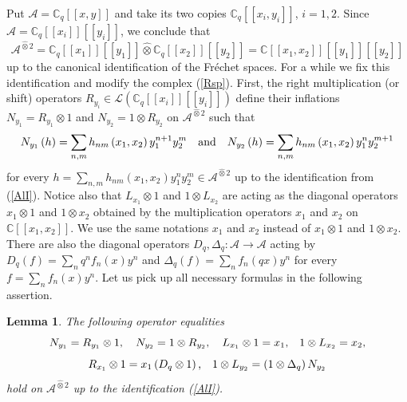 \documentclass[12pt,reqno]{amsart}%
\theoremstyle{plain}
\newtheorem{lemma}{Lemma}
\numberwithin{theorem}{section} \numberwithin{equation}{section}
\numberwithin{lemma}{section}
\numberwithin{remark}{section}
\numberwithin{example}{section}
\numberwithin{proposition}{section}
\numberwithin{definition}{section}
\numberwithin{corollary}{section}
\begin{document}
Put $\mathcal{A}=\mathbb{C}_{q}\left[  \left[  x,y\right]  \right]  $ and take
its two copies $\mathbb{C}_{q}\left[  \left[  x_{i},y_{i}\right]  \right]  $,
$i=1,2$. Since $\mathcal{A}=\mathbb{C}_{q}\left[  \left[  x_{i}\right]
\right]  \left[  \left[  y_{i}\right]  \right]  $, we conclude that
\begin{equation}
\mathcal{A}^{\widehat{\otimes}2}=\mathbb{C}_{q}\left[  \left[  x_{1}\right]
\right]  \left[  \left[  y_{1}\right]  \right]  \widehat{\otimes}%
\mathbb{C}_{q}\left[  \left[  x_{2}\right]  \right]  \left[  \left[
y_{2}\right]  \right]  =\mathbb{C}\left[  \left[  x_{1},x_{2}\right]  \right]
\left[  \left[  y_{1}\right]  \right]  \left[  \left[  y_{2}\right]  \right]
\label{AlI}%
\end{equation}
up to the canonical identification of the Fr\'{e}chet spaces. For a while we
fix this identification and modify the complex (\ref{Rsp}). First, the right
multiplication (or shift) operators $R_{y_{i}}\in\mathcal{L}\left(
\mathbb{C}_{q}\left[  \left[  x_{i}\right]  \right]  \left[  \left[
y_{i}\right]  \right]  \right)  $ define their inflations $N_{y_{1}}=R_{y_{1}%
}\otimes1$ and $N_{y_{2}}=1\otimes R_{y_{2}}$ on $\mathcal{A}%
^{\widehat{\otimes}2}$ such that
\[
N_{y_{1}}\left(  h\right)  =\sum_{n,m}h_{nm}\left(  x_{1},x_{2}\right)
y_{1}^{n+1}y_{2}^{m}\text{\quad and\quad}N_{y_{2}}\left(  h\right)
=\sum_{n,m}h_{nm}\left(  x_{1},x_{2}\right)  y_{1}^{n}y_{2}^{m+1}%
\]
for every $h=\sum_{n,m}h_{nm}\left(  x_{1},x_{2}\right)  y_{1}^{n}y_{2}^{m}%
\in\mathcal{A}^{\widehat{\otimes}2}$ up to the identification from
(\ref{AlI}). Notice also that $L_{x_{1}}\otimes1$ and $1\otimes L_{x_{2}}$ are
acting as the diagonal operators $x_{1}\otimes1$ and $1\otimes x_{2}$ obtained
by the multiplication operators $x_{1}$ and $x_{2}$ on $\mathbb{C}\left[
\left[  x_{1},x_{2}\right]  \right]  $. We use the same notations $x_{1}$ and
$x_{2}$ instead of $x_{1}\otimes1$ and $1\otimes x_{2}$. There are also the
diagonal operators $D_{q},\Delta_{q}:\mathcal{A\rightarrow A}$ acting by
$D_{q}\left(  f\right)  =\sum_{n}q^{n}f_{n}\left(  x\right)  y^{n}$ and
$\Delta_{q}\left(  f\right)  =\sum_{n}f_{n}\left(  qx\right)  y^{n}$ for every
$f=\sum_{n}f_{n}\left(  x\right)  y^{n}$. Let us pick up all necessary
formulas in the following assertion.

\begin{lemma}
\label{lemCLR}The following operator equalities%
\[
N_{y_{1}}=R_{y_{1}}\otimes1,\quad N_{y_{2}}=1\otimes R_{y_{2}},\quad L_{x_{1}%
}\otimes1=x_{1}\text{,\quad}1\otimes L_{x_{2}}=x_{2},
\]%
\[
R_{x_{1}}\otimes1=x_{1}\left(  D_{q}\otimes1\right)  \text{,\quad}1\otimes
L_{y_{2}}=\left(  1\otimes\Delta_{q}\right)  N_{y_{2}}%
\]
hold on $\mathcal{A}^{\widehat{\otimes}2}$ up to the identification (\ref{AlI}).
\end{lemma}
\end{document}
